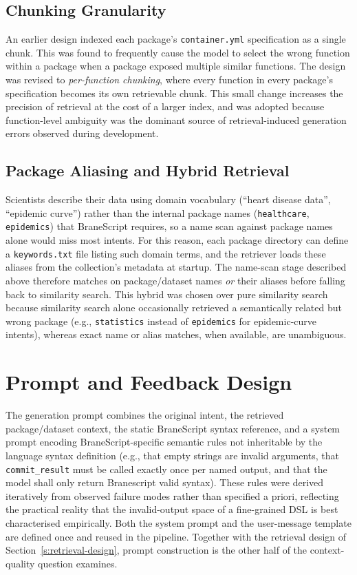 \subsection{Chunking Granularity}

An earlier design indexed each package's \texttt{container.yml} specification
as a single chunk. This was found to
frequently cause the model to select the wrong function within a package when
a package exposed multiple similar functions. The design was revised to
\emph{per-function chunking}, where every function in every package's specification
becomes its own retrievable chunk.
This small change increases the precision of retrieval at the cost of a larger
index, and was adopted because function-level ambiguity was the dominant source
of retrieval-induced generation errors observed during development.

\subsection{Package Aliasing and Hybrid Retrieval}

Scientists describe their data using domain vocabulary (``heart disease data'',
``epidemic curve'') rather than the internal package names
(\texttt{healthcare}, \texttt{epidemics}) that BraneScript requires, so a
name scan against package names alone would miss most intents. For this reason, each package
directory can define a \texttt{keywords.txt} file listing such domain terms, and
the retriever loads these aliases from the collection's metadata at startup.
The name-scan stage described above therefore matches on package/dataset names \emph{or} their
aliases before falling back to similarity search. This hybrid was chosen over
pure similarity search because similarity search alone occasionally retrieved
a semantically related but wrong package (e.g., \texttt{statistics} instead of
\texttt{epidemics} for epidemic-curve intents), whereas exact name or alias
matches, when available, are unambiguous.

\section{Prompt and Feedback Design}\label{s:prompt-design}

The generation prompt combines the original intent, the retrieved
package/dataset context, the static BraneScript syntax reference, and a
system prompt encoding BraneScript-specific semantic rules not inheritable by the language syntax definition (e.g., that empty strings
are invalid arguments, that \texttt{commit\_result} must be called
exactly once per named output, and that the model shall only return Branescript valid syntax).
These rules were derived iteratively from
observed failure modes rather than specified a priori, reflecting the
practical reality that the invalid-output space of a fine-grained DSL is best
characterised empirically. Both the system prompt and the user-message
template are defined once and reused in the pipeline. Together with the
retrieval design of Section~\ref{s:retrieval-design}, prompt construction
is the other half of the context-quality question  examines.

